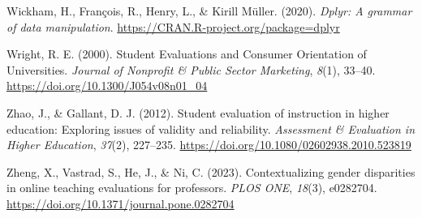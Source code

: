\documentclass[
  man]{apa7}
\newlength{\cslhangindent}
\newlength{\cslentryspacingunit} %
\newenvironment{CSLReferences}[2] %
 {%
  \setlength{\parindent}{0pt}
  \ifodd #1
  \let\oldpar\par
  \def\par{\hangindent=\cslhangindent\oldpar}
  \fi
  \setlength{\parskip}{#2\cslentryspacingunit}
 }%
 {}
\begin{document}
\begin{CSLReferences}{1}{0}
\leavevmode{}%
Wickham, H., François, R., Henry, L., \& Kirill Müller. (2020). \emph{Dplyr: A grammar of data manipulation}. \url{https://CRAN.R-project.org/package=dplyr}

\leavevmode{}%
Wright, R. E. (2000). Student Evaluations and Consumer Orientation of Universities. \emph{Journal of Nonprofit \& Public Sector Marketing}, \emph{8}(1), 33--40. \url{https://doi.org/10.1300/J054v08n01_04}

\leavevmode{}%
Zhao, J., \& Gallant, D. J. (2012). Student evaluation of instruction in higher education: Exploring issues of validity and reliability. \emph{Assessment \& Evaluation in Higher Education}, \emph{37}(2), 227--235. \url{https://doi.org/10.1080/02602938.2010.523819}

\leavevmode{}%
Zheng, X., Vastrad, S., He, J., \& Ni, C. (2023). Contextualizing gender disparities in online teaching evaluations for professors. \emph{PLOS ONE}, \emph{18}(3), e0282704. \url{https://doi.org/10.1371/journal.pone.0282704}

\end{CSLReferences}
\end{document}
